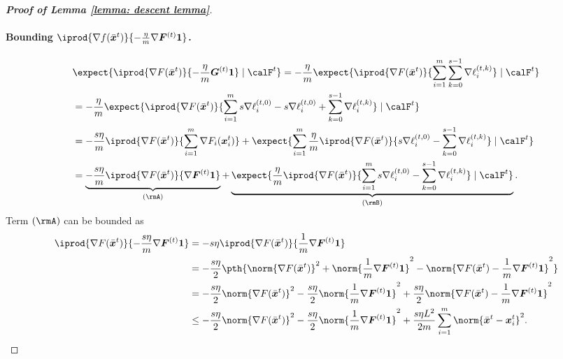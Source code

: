 \documentclass[letterpaper, 10 pt, conference]{ieeeconf}  %
\newcommand{\x}{{\bm x}}
\begin{document}
\begin{proof}[\bf Proof of Lemma \ref{lemma: descent lemma}]
\paragraph{Bounding $\iprod{\nabla f(\bar{\x}^{t})}{- \frac{\eta}{m} \nabla \bm{F}^{(t)} \bm{1}}$.}
\begin{align*}
&\expect{\iprod{\nabla F(\bar{\x}^{t})}{- \frac{\eta}{m} \bm{G}^{(t)} \bm{1}} \mid \calF^{t}} 
 = - \frac{\eta}{m} \expect{\iprod{\nabla F(\bar{\x}^{t})}{\sum_{i=1}^m \sum_{k=0}^{s-1} \nabla \ell_i^{(t,k)}} \mid \calF^{t}}    \\
& = - \frac{\eta}{m} \expect{\iprod{\nabla F(\bar{\x}^{t})}{\sum_{i=1}^m s \nabla \ell_i^{(t,0)} - s \nabla \ell_i^{(t,0)} +\sum_{k=0}^{s-1} \nabla \ell_i^{(t,k)}} \mid \calF^{t}} \\
& =  - \frac{s\eta}{m} \iprod{\nabla F(\bar{\x}^{t})}{\sum_{i=1}^m  \nabla F_i(\x_i^t)} + \expect{\sum_{i=1}^m \frac{\eta}{m} \iprod{\nabla F(\bar{\x}^{t})}{s \nabla \ell_i^{(t,0)} - \sum_{k=0}^{s-1} \nabla \ell_i^{(t,k)}} \mid \calF^{t}} \\
& = \underbrace{- \frac{s\eta}{m} \iprod{\nabla F(\bar{\x}^{t})}{\nabla \bm{F}^{(t)}\bm{1}}}_{(\rmA)} + \underbrace{\expect{\frac{\eta}{m} \iprod{\nabla F(\bar{\x}^{t})}{\sum_{i=1}^m s \nabla \ell_i^{(t,0)} - \sum_{k=0}^{s-1} \nabla \ell_i^{(t,k)} }\mid \calF^{t}}}_{(\rmB)}.  
\end{align*}
Term $(\rmA)$ can be bounded as 
\begin{align*}
\iprod{\nabla F(\bar{\x}^{t})}{- \frac{s\eta}{m} \nabla \bm{F}^{(t)} \bm{1}} 
& = - s\eta\iprod{\nabla F(\bar{\x}^{t})}{ \frac{1}{m} \nabla \bm{F}^{(t)} \bm{1}} \\
& = - \frac{s \eta}{2}\pth{\norm{\nabla F(\bar{\x}^{t})}^2 + \norm{\frac{1}{m}\nabla \bm{F}^{(t)}\bm{1}}^2 - \norm{\nabla F(\bar{\x}^{t}) - \frac{1}{m}\nabla \bm{F}^{(t)}\bm{1}}^2} \\
& =  -\frac{s\eta}{2} \norm{\nabla F(\bar{\x}^{t})}^2 - \frac{s\eta}{2} \norm{\frac{1}{m}\nabla \bm{F}^{(t)}\bm{1}}^2 
+ \frac{s\eta}{2} \norm{\nabla F(\bar{\x}^{t}) - \frac{1}{m}\nabla \bm{F}^{(t)}\bm{1}}^2 \\
& \le  -\frac{s\eta}{2} \norm{\nabla F(\bar{\x}^{t})}^2 - \frac{s\eta}{2} \norm{\frac{1}{m}\nabla \bm{F}^{(t)}\bm{1}}^2 
+ \frac{s\eta L^2 }{2m}\sum_{i=1}^m \norm{\bar{\x}^{t} - \x_i^t}^2.   
\end{align*}


\end{proof}
\end{document}

